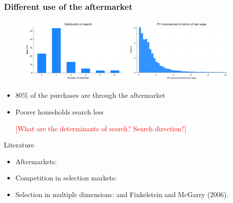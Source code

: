 \documentclass[10pt,aspectratio=169]{beamer}
\begin{document}
\begin{frame}
\frametitle{Different use of the aftermarket}\label{slide:single_fig}
\begin{figure}
    \centering
    \includegraphics[width=0.49\textwidth]{../figures/IE3_dist_external_offers.png}
    \hfill 
    \includegraphics[width=0.49\textwidth]{../figures/IE3_offer_improvement_histogram.png}
\end{figure}

\begin{itemize}
    \item   80\% of the purchases are through the aftermarket 
    \item Poorer households search less \hyperlink{slide:fig4}{} 
    
    \textcolor{red}{[What are the determinants of search? Search direction?] }
\end{itemize}

\end{frame}


\begin{frame}{Literature}
\begin{itemize}
    \item Aftermarkets: \textcite{larsen_efficiency_2021, allen_search_2019}

    \item Competition in selection markets: \textcite{mahoney_imperfect_2017, cuesta_price_2018, cosconati_competing_2025}

    \item Selection in multiple dimensions: \textcite{finkelstein_adverse_2004} and Finkelstein and McGarry (2006).  
\end{itemize}
\end{frame}
\end{document}
